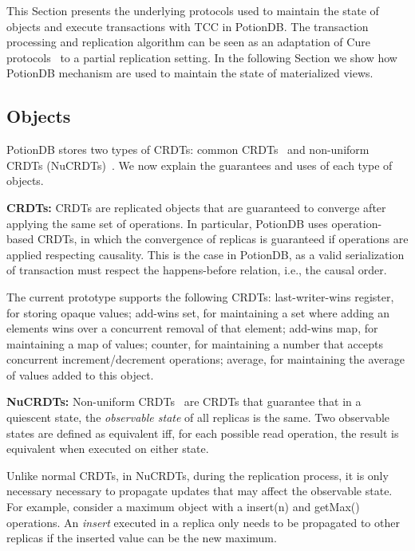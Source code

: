 \documentclass[sigconf, nonacm]{acmart}
\newcommand{\code}[1]{\textsf{\small{#1}}}
\begin{document}
This Section presents the underlying protocols used to maintain the state of objects
and execute transactions with TCC in PotionDB. The transaction processing and replication
algorithm can be seen as an adaptation of Cure protocols~\cite{cure} to a partial replication
setting. In the following Section we show how PotionDB mechanism are used to maintain
the state of materialized views.

\subsection{Objects}
\label{sec:tx:objs}

PotionDB stores two types of CRDTs: common CRDTs~\cite{crdt} and non-uniform CRDTs (NuCRDTs)~\cite{Cabrita17Nonuniform}.
We now explain the guarantees and uses of each type of objects.

\noindent
\textbf{CRDTs:} CRDTs are replicated objects that are guaranteed to converge
after applying the same set of operations. In particular, PotionDB uses operation-based CRDTs,
in which the convergence of replicas is guaranteed if operations are applied respecting causality. 
This is the case in PotionDB, as a valid serialization of transaction must respect the happens-before
relation, i.e., the causal order.

The current prototype supports the following CRDTs: last-writer-wins register, for storing opaque values;
add-wins set, for maintaining a set where adding an elements wins over a concurrent removal of that element;
add-wins map, for maintaining a map of values;
counter, for maintaining a number that accepts concurrent increment/decrement operations;
average, for maintaining the average of values added to this object.

\noindent
\textbf{NuCRDTs:} Non-uniform CRDTs~\cite{Cabrita17Nonuniform} are CRDTs that guarantee that in a quiescent state, 
the \emph{observable state} of all replicas is the same. 
Two observable states are defined as equivalent iff, for each possible read operation, the result is equivalent when executed on either state.

Unlike normal CRDTs, in NuCRDTs, during the replication process, it is only necessary necessary to propagate
updates that may affect the observable state. For example, consider a maximum object with a \code{insert(n)} and 
\code{getMax()} operations. An \emph{insert} executed in a replica only needs to be propagated 
to other replicas if the inserted value can be the new maximum. 
\end{document}
